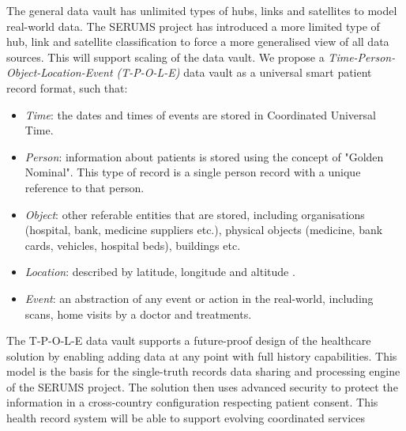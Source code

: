 %
%
The general data vault has unlimited types of hubs, links and satellites to model real-world data. The SERUMS project has introduced a more limited type of hub, link and satellite classification \cite{Linstedt2012} to force a more generalised view of all data sources. This will support scaling \cite{Linstedt2016} of the data vault. We propose a \emph{Time-Person-Object-Location-Event (T-P-O-L-E)} data vault as a universal smart patient record format, such that:

\begin{itemize}
    \item \emph{Time}: the dates and times of events are stored in Coordinated Universal Time.
    \item \emph{Person}: information  about  patients  is  stored  using  the  concept of "Golden Nominal".  This type of record is a single person record with a unique reference to that person.
    \item \emph{Object}: other referable entities that are stored, including organisations (hospital, bank, medicine suppliers etc.), physical objects (medicine, bank cards, vehicles, hospital beds), buildings etc.
    \item \emph{Location}: described by latitude, longitude and altitude \cite{Li2016a}.
    \item \emph{Event}: an abstraction of any event or action in the real-world, including scans, home visits by a doctor and treatments. 
\end{itemize}
The T-P-O-L-E data vault supports a future-proof design of the healthcare solution by enabling adding data at any point with full history capabilities. This model is the basis for the single-truth records data sharing and processing engine of the SERUMS project. The solution then uses advanced security to protect the information in a cross-country configuration respecting patient consent. This health record system will be able to support evolving coordinated services~\cite{Silow-Carroll2012} 